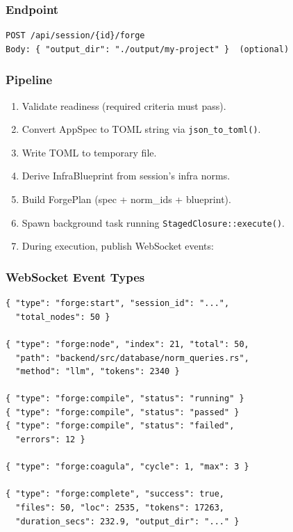 \documentclass[11pt,a4paper]{article}
\begin{document}
\subsubsection{Endpoint}

\begin{lstlisting}[style=bash]
POST /api/session/{id}/forge
Body: { "output_dir": "./output/my-project" }  (optional)
\end{lstlisting}

\subsubsection{Pipeline}

\begin{enumerate}[nosep]
\item Validate readiness (required criteria must pass).
\item Convert AppSpec to TOML string via \texttt{json\_to\_toml()}.
\item Write TOML to temporary file.
\item Derive InfraBlueprint from session's infra norms.
\item Build ForgePlan (spec + norm\_ids + blueprint).
\item Spawn background task running \texttt{StagedClosure::execute()}.
\item During execution, publish WebSocket events:
\end{enumerate}

\subsubsection{WebSocket Event Types}

\begin{lstlisting}[style=json]
{ "type": "forge:start", "session_id": "...", 
  "total_nodes": 50 }

{ "type": "forge:node", "index": 21, "total": 50,
  "path": "backend/src/database/norm_queries.rs",
  "method": "llm", "tokens": 2340 }

{ "type": "forge:compile", "status": "running" }
{ "type": "forge:compile", "status": "passed" }
{ "type": "forge:compile", "status": "failed", 
  "errors": 12 }

{ "type": "forge:coagula", "cycle": 1, "max": 3 }

{ "type": "forge:complete", "success": true,
  "files": 50, "loc": 2535, "tokens": 17263,
  "duration_secs": 232.9, "output_dir": "..." }
\end{lstlisting}
\end{document}
